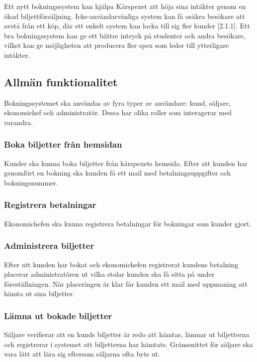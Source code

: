 \documentclass[a4paper, twoside, 11pt, titlepage]{article}
\begin{document}
	Ett nytt bokningssystem kan hjälpa Kårspexet att höja sina intäkter genom en ökad biljettförsäljning. Icke-användarvänliga system kan få osäkra besökare att avstå från ett köp, där ett enkelt system kan locka till sig fler kunder [2.1.1]. Ett bra bokningssystem kan ge ett bättre intryck på studenter och andra besökare, vilket kan ge möjligheten att producera fler spex som leder till ytterligare intäkter.

	\subsection{Allmän funktionalitet}


	Bokningssystemet ska användas av fyra typer av användare: kund, säljare, ekonomichef och administratör. Dessa har olika roller som interagerar med varandra.

		\subsubsection{Boka biljetter från hemsidan}


		Kunder ska kunna boka biljetter från kårspexets hemsida. Efter att kunden har genomfört en bokning ska kunden få ett mail med betalningsuppgifter och bokningsnummer.

		\subsubsection{Registrera betalningar}


		Ekonomichefen ska kunna registrera betalningar för bokningar som kunder gjort.

		\subsubsection{Administrera biljetter}


		Efter att kunden har bokat och ekonomichefen registrerat kundens betalning placerar administratören ut vilka stolar kunden ska få sitta på under föreställningen. När placeringen är klar får kunden ett mail med uppmaning att hämta ut sina biljetter.

		\subsubsection{Lämna ut bokade biljetter}


		Säljare verifierar att en kunds biljetter är redo att hämtas, lämnar ut biljetterna och registrerar i systemet att biljetterna har hämtats. Gränssnittet för säljare ska vara lätt att lära sig eftersom säljarna ofta byts ut.
\end{document}
